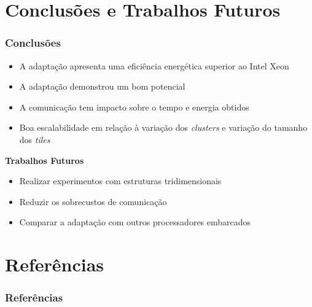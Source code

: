 \documentclass[xcolor={table}]{beamer}
\begin{document}


\section{Conclusões e Trabalhos Futuros}
\begin{frame}\frametitle{Conclusões}
    \begin{itemize}
        \item A adaptação apresenta uma eficiência energética superior ao Intel Xeon
        \item A adaptação demonstrou um bom potencial
        \item A comunicação tem impacto sobre o tempo e energia obtidos
        \item Boa escalabilidade em relação à variação dos \textit{clusters} e variação do tamanho dos \textit{tiles}
    \end{itemize}

    \vspace{0.5cm}

    \textbf{Trabalhos Futuros}
    \begin{itemize}
        \item Realizar experimentos com estruturas tridimensionais
        \item Reduzir os sobrecustos de comunicação
        \item Comparar a adaptação com outros processadores embarcados
    \end{itemize}
\end{frame}

\begingroup
    \makeatletter
    \setlength{\hoffset}{-.5\beamer@sidebarwidth}
    \makeatother
    \begin{frame}
        \titlepage
    \end{frame}
\endgroup

\section{Referências}
\begin{frame}\frametitle{Referências}
    {\tiny
        
        }
\end{frame}
\end{document}
